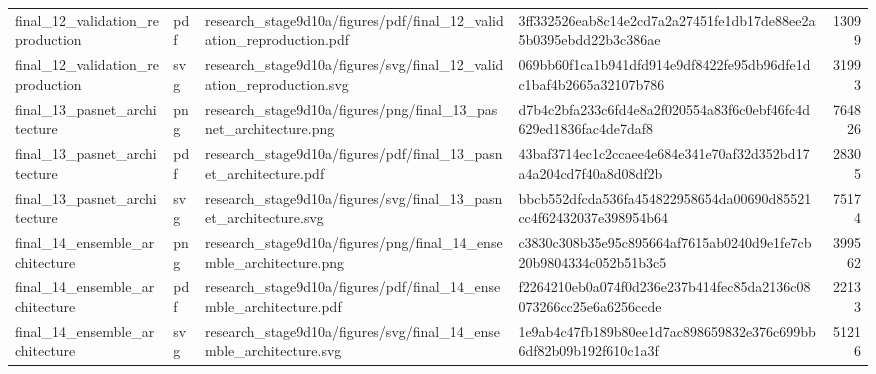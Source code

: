 \begin{tabular}{llllr}
final\_12\_validation\_reproduction & pdf & research\_stage9d10a/figures/pdf/final\_12\_validation\_reproduction.pdf & 3ff332526eab8c14e2cd7a2a27451fe1db17de88ee2a5b0395ebdd22b3c386ae & 13099 \\
final\_12\_validation\_reproduction & svg & research\_stage9d10a/figures/svg/final\_12\_validation\_reproduction.svg & 069bb60f1ca1b941dfd914e9df8422fe95db96dfe1dc1baf4b2665a32107b786 & 31993 \\
final\_13\_pasnet\_architecture & png & research\_stage9d10a/figures/png/final\_13\_pasnet\_architecture.png & d7b4c2bfa233c6fd4e8a2f020554a83f6c0ebf46fc4d629ed1836fac4de7daf8 & 764826 \\
final\_13\_pasnet\_architecture & pdf & research\_stage9d10a/figures/pdf/final\_13\_pasnet\_architecture.pdf & 43baf3714ec1c2ccaee4e684e341e70af32d352bd17a4a204cd7f40a8d08df2b & 28305 \\
final\_13\_pasnet\_architecture & svg & research\_stage9d10a/figures/svg/final\_13\_pasnet\_architecture.svg & bbcb552dfcda536fa454822958654da00690d85521cc4f62432037e398954b64 & 75174 \\
final\_14\_ensemble\_architecture & png & research\_stage9d10a/figures/png/final\_14\_ensemble\_architecture.png & c3830c308b35e95c895664af7615ab0240d9e1fe7cb20b9804334c052b51b3c5 & 399562 \\
final\_14\_ensemble\_architecture & pdf & research\_stage9d10a/figures/pdf/final\_14\_ensemble\_architecture.pdf & f2264210eb0a074f0d236e237b414fec85da2136c08073266cc25e6a6256ccde & 22133 \\
final\_14\_ensemble\_architecture & svg & research\_stage9d10a/figures/svg/final\_14\_ensemble\_architecture.svg & 1e9ab4c47fb189b80ee1d7ac898659832e376c699bb6df82b09b192f610c1a3f & 51216 \\
\bottomrule
\end{tabular}
